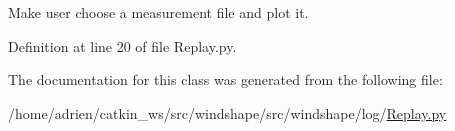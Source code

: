 \begin{DoxyVerb}Make user choose a measurement file and plot it.\end{DoxyVerb}
 

Definition at line 20 of file Replay.\+py.



The documentation for this class was generated from the following file\+:\begin{DoxyCompactItemize}
\item 
/home/adrien/catkin\+\_\+ws/src/windshape/src/windshape/log/\mbox{\hyperlink{_replay_8py}{Replay.\+py}}\end{DoxyCompactItemize}
